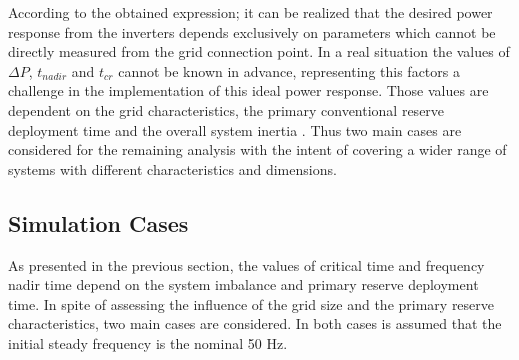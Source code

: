 
According to the obtained expression; it can be realized that the desired power response from the inverters depends exclusively on parameters which cannot be directly measured from the grid connection point. In a real situation the values of $\Delta P$, $ t_{nadir} $ and $ t_{cr} $ cannot be known in advance, representing this factors a challenge in the implementation of this ideal power response. Those values are dependent on the grid characteristics, the primary conventional reserve deployment time and the overall system inertia \cite{orum2015future}. Thus two main cases are considered for the remaining analysis with the intent of covering a wider range of systems with different characteristics and dimensions.

\subsection{Simulation Cases}

As presented in the previous section, the values of critical time and frequency nadir time depend on the system imbalance and primary reserve deployment time.  In spite of assessing the influence of the grid size and the primary reserve characteristics, two main cases are considered. In both cases is assumed that the initial steady frequency is the nominal 50 Hz.


